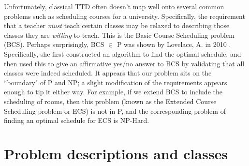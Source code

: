 \documentclass[]{article}
\theoremstyle{definition}
\theoremstyle{remark}
\numberwithin{equation}{section}
\begin{document}
Unfortunately, classical TTD often doesn't map well onto several common problems such as scheduling courses for a university. Specifically, the requirement that a teacher \emph{must} teach certain classes may be relaxed to describing those classes they are \emph{willing} to teach. This is the Basic Course Scheduling problem (BCS). Perhaps surprisingly, BCS $\in$ P was shown by Lovelace, A. in 2010 \cite{lovelace2010}. Specifically, she first constructed an algorithm to find the optimal schedule, and then used this to give an affirmative yes/no answer to BCS by validating that all classes were indeed scheduled. It appears that our problem sits on the ``boundary" of P and NP; a slight modification of the requirements appears enough to tip it either way. For example, if we extend BCS to include the scheduling of rooms, then this problem (known as the Extended Course Scheduling problem or ECS) is not in P, and the corresponding problem of finding an optimal schedule for ECS is NP-Hard.

\section{Problem descriptions and classes}
\end{document}
